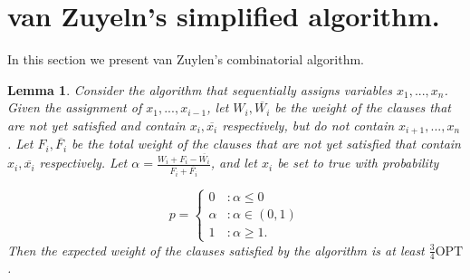 \documentclass[11pt,letter]{article}
\newtheorem{lemma}{Lemma}
\begin{document}
\section{van Zuyeln's simplified algorithm.}

In this section we present van Zuylen's combinatorial algorithm. 

\begin{lemma}
Consider the algorithm that sequentially assigns variables $x_1,...,x_n$. Given the assignment of $x_1,...,x_{i-1}$,
 let $W_i, \overline{W_i}$ be the weight of the clauses that are not yet satisfied and contain $x_i, \overline{x_i}$ respectively,
 but do not contain $x_{i+1}, ..., x_n$. Let $F_i, \overline{F_i}$ be the total weight of the clauses that are not yet satisfied 
 that contain $x_i, \overline{x_i}$ respectively. Let $\alpha = \frac{W_i + F_i - \overline{W_i}}{F_i + \overline{F_i}}$, and let $x_i$ be set to true with probability 

\begin{displaymath}
  p = \left\{
     \begin{array}{lr}
       0 & : \alpha \leq 0\\
       \alpha & : \alpha \in (0,1) \\ 
       1 & : \alpha \geq 1.
     \end{array}
   \right.
\end{displaymath}  
Then the expected weight of the clauses satisfied by the algorithm is at least $\frac{3}{4} \text{OPT}$. 
\end{lemma} 
\end{document}
